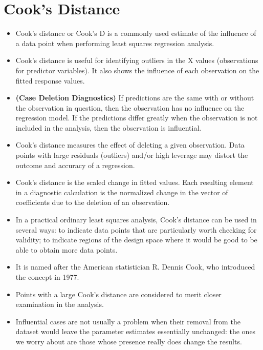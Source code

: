 \documentclass[residuals.tex]{subfiles}
\begin{document}
	\Large
	\section{Cook's Distance}	
	\begin{itemize}
		\item Cook's distance or Cook's D is a commonly used estimate of the influence of a data point when performing least squares regression analysis.
		
		\item Cook's distance is useful for identifying outliers in the X values (observations for predictor variables). It also shows the influence of each observation on the fitted response values. 
		\item \textbf{(Case Deletion Diagnostics)} If  predictions are the same with or without the observation in question, then the observation has no influence on the regression model. If the predictions differ greatly when the observation is not included in the analysis, then the observation is influential.
		\item Cook's distance measures the effect of deleting a given observation. Data points with large residuals (outliers) and/or high leverage may distort the outcome and accuracy of a regression. 
	\end{itemize}
	\bigskip
	\begin{itemize}
		\item 
		Cook's distance is the scaled change in fitted values. Each resulting element in a diagnostic calculation is the normalized change in the vector of coefficients due to the deletion of an observation. 
		
		\item In a practical ordinary least squares analysis, Cook's distance can be used in several ways: to indicate data points that are particularly worth checking for validity; to indicate regions of the design space where it would be good to be able to obtain more data points. 
		\item 
		It is named after the American statistician R. Dennis Cook, who introduced the concept in 1977.
		
		
		\item Points with a large Cook's distance are considered to merit closer examination in the analysis. 
		
		\item Influential cases are not usually a problem when their removal from the dataset would leave the parameter estimates essentially unchanged: the ones we worry about are those whose presence really does change the results. 
	\end{itemize}
	\bigskip
\end{document}
